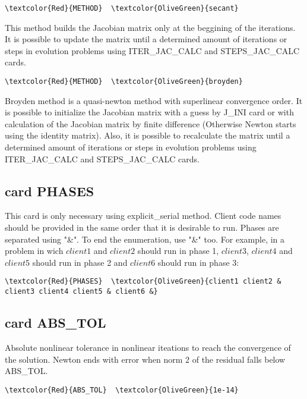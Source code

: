 \begin{Verbatim}[frame=single,commandchars=\\\{\}]
\textcolor{Red}{METHOD}  \textcolor{OliveGreen}{secant} 
\end{Verbatim}
This method builds the Jacobian matrix only at the beggining of the iterations. It is possible to update the matrix until a determined amount of iterations or steps in evolution problems using ITER_JAC_CALC and STEPS_JAC_CALC cards.

\begin{Verbatim}[frame=single,commandchars=\\\{\}]
\textcolor{Red}{METHOD}  \textcolor{OliveGreen}{broyden}
\end{Verbatim}
Broyden method is a quasi-newton method with superlinear convergence order. It is possible to initialize the Jacobian matrix with a guess by J_INI card or with calculation of the Jacobian matrix by finite difference (Otherwise Newton starts using the identity matrix). Also, it is possible to recalculate the matrix until a determined amount of iterations or steps in evolution problems using ITER_JAC_CALC and STEPS_JAC_CALC cards.

\subsection{card PHASES}
This card is only necessary using explicit_serial method. Client code names should be provided in the same order that it is desirable to run. Phases are separated using "\&". To end the enumeration, use "\&" too. For example, in a problem in wich $client1$ and $client2$ should run in phase 1, $client3$, $client4$ and $client5$ should run in phase 2 and $client6$ should run in phase 3:
\begin{Verbatim}[frame=single,commandchars=\\\{\}]
\textcolor{Red}{PHASES}  \textcolor{OliveGreen}{client1 client2 & client3 client4 client5 & client6 &}
\end{Verbatim}

\subsection{card ABS_TOL}
Absolute nonlinear tolerance in nonlinear iteations to reach the convergence of the solution. Newton ends with error when norm 2 of the residual falls below ABS_TOL.
\begin{Verbatim}[frame=single,commandchars=\\\{\}]
\textcolor{Red}{ABS_TOL}  \textcolor{OliveGreen}{1e-14}
\end{Verbatim}

